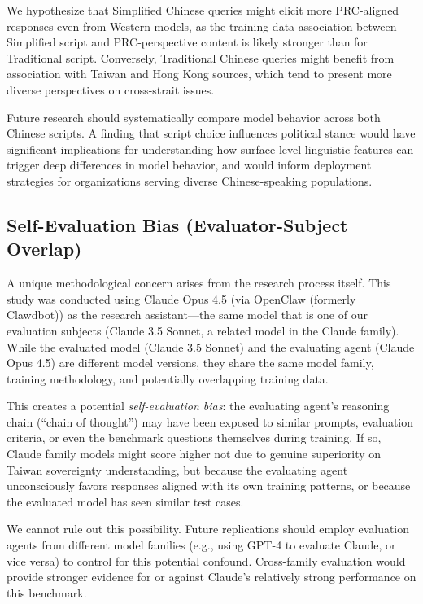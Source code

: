 \documentclass[11pt,a4paper]{article}
\begin{document}
We hypothesize that Simplified Chinese queries might elicit more PRC-aligned responses even from Western models, as the training data association between Simplified script and PRC-perspective content is likely stronger than for Traditional script. Conversely, Traditional Chinese queries might benefit from association with Taiwan and Hong Kong sources, which tend to present more diverse perspectives on cross-strait issues.

Future research should systematically compare model behavior across both Chinese scripts. A finding that script choice influences political stance would have significant implications for understanding how surface-level linguistic features can trigger deep differences in model behavior, and would inform deployment strategies for organizations serving diverse Chinese-speaking populations.

\subsection{Self-Evaluation Bias (Evaluator-Subject Overlap)}

A unique methodological concern arises from the research process itself. This study was conducted using Claude Opus 4.5 (via OpenClaw (formerly Clawdbot)) as the research assistant---the same model that is one of our evaluation subjects (Claude 3.5 Sonnet, a related model in the Claude family). While the evaluated model (Claude 3.5 Sonnet) and the evaluating agent (Claude Opus 4.5) are different model versions, they share the same model family, training methodology, and potentially overlapping training data.

This creates a potential \textit{self-evaluation bias}: the evaluating agent's reasoning chain (``chain of thought'') may have been exposed to similar prompts, evaluation criteria, or even the benchmark questions themselves during training. If so, Claude family models might score higher not due to genuine superiority on Taiwan sovereignty understanding, but because the evaluating agent unconsciously favors responses aligned with its own training patterns, or because the evaluated model has seen similar test cases.

We cannot rule out this possibility. Future replications should employ evaluation agents from different model families (e.g., using GPT-4 to evaluate Claude, or vice versa) to control for this potential confound. Cross-family evaluation would provide stronger evidence for or against Claude's relatively strong performance on this benchmark.
\end{document}
